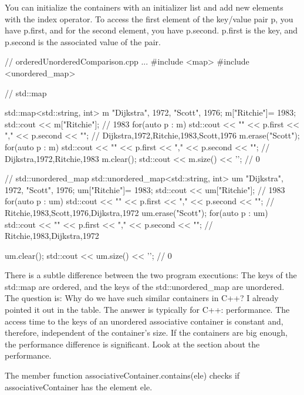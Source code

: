 You can initialize the containers with an initializer list and add new elements with the index operator. To access the first element of the key/value pair p, you have p.first, and for the second element, you have p.second. p.first is the key, and p.second is the associated value of the pair.


\begin{cpp}
// orderedUnorderedComparison.cpp
...
#include <map>
#include <unordered_map>

// std::map

std::map<std::string, int> m {{"Dijkstra", 1972}, {"Scott", 1976}};
m["Ritchie"]= 1983;
std::cout << m["Ritchie"]; // 1983
for(auto p : m) std::cout << "{" << p.first << "," << p.second << "}";
							// {Dijkstra,1972},{Ritchie,1983},{Scott,1976}
m.erase("Scott");
for(auto p : m) std::cout << "{" << p.first << "," << p.second << "}";
								// {Dijkstra,1972},{Ritchie,1983}
m.clear();
std::cout << m.size() << '\n'; // 0

// std::unordered_map
std::unordered_map<std::string, int> um {{"Dijkstra", 1972}, {"Scott", 1976}};
um["Ritchie"]= 1983;
std::cout << um["Ritchie"]; // 1983
for(auto p : um) std::cout << "{" << p.first << "," << p.second << "}";
								// {Ritchie,1983},{Scott,1976},{Dijkstra,1972}
um.erase("Scott");
for(auto p : um) std::cout << "{" << p.first << "," << p.second << "}";
								// {Ritchie,1983},{Dijkstra,1972}

um.clear();
std::cout << um.size() << '\n'; // 0
\end{cpp}

There is a subtle difference between the two program executions: The keys of the std::map are ordered, and the keys of the std::unordered\_map are unordered. The question is: Why do we have such similar containers in C++? I already pointed it out in the table. The answer is typically for C++: performance. The access time to the keys of an unordered associative container is constant and, therefore, independent of the container’s size. If the containers are big enough, the performance difference is significant. Look at the section about the performance.


The member function associativeContainer.contains(ele) checks if associativeContainer has the element ele.


